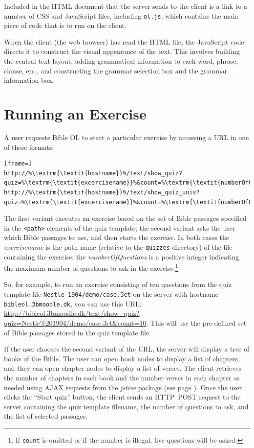 \documentclass[11pt,oneside,a4paper]{memoir}
\newcommand*{\xml}[1]{\texttt{<#1>}}
\begin{document}
Included in the HTML document that the server sends to the client is a link to a number of CSS and
JavaScript files, including \texttt{ol.js}, which contains the main piece of code that is to run on
the client.

When the client (the web browser) has read the HTML file, the JavaScript code directs it to construct
the visual appearance of the text. This involves building the central text layout, adding
grammatical information to each word, phrase, clause, etc., and constructing the grammar selection
box and the grammar information box.

\section{Running an Exercise}

A user requests Bible OL to start a particular exercise by accessing a URL in one of these
formats:

\begin{lstlisting}[frame=]
http://%\textrm{\textit{hostname}}%/text/show_quiz?quiz=%\textrm{\textit{excercisename}}%&count=%\textrm{\textit{numberOfQuestions}}%
http://%\textrm{\textit{hostname}}%/text/show_quiz_univ?quiz=%\textrm{\textit{excercisename}}%&count=%\textrm{\textit{numberOfQuestions}}%
\end{lstlisting}

The first variant executes an exercise based on the set of Bible passages specified in the
\xml{path} elements of the quiz template; the second variant asks the user which Bible passages to use, and then
starts the exercise. In both cases the \emph{exercisename} is the path name (relative to the
\texttt{quizzes} directory) of the file containing the exercise; the \emph{numberOfQuestions} is a
positive integer indicating the maximum number of questions to ask in the exercise.\footnote{If
  \texttt{count} is omitted or if the number is illegal, five questions will be asked.}

So, for example, to run an exercise consisting of ten questions from the quiz template file
\texttt{Nestle~1904/demo/case.3et} on the server with hostname \texttt{bibleol.3bmoodle.dk}, you can
use this URL:
\url{http://bibleol.3bmoodle.dk/text/show_quiz?quiz=Nestle\%201904/demo/case.3et&count=10}. This
will use the pre-defined set of Bible passages stored in the quiz template file.

If the user chooses the second variant of the URL, the server will display a tree of books of the Bible.
The user can open book nodes to display a list of chapters, and they can open chapter nodes to display
a list of verses. The client retrieves the number of chapters in each book and the number verses in
each chapter as needed using AJAX requests from the \emph{jstree} package (see page
\pageref{jstree}). Once the user clicks the ``Start quiz'' button, the client sends an HTTP~POST
request to the server containing the quiz template filename, the number of questions to ask, and the
list of selected passages.
\end{document}
